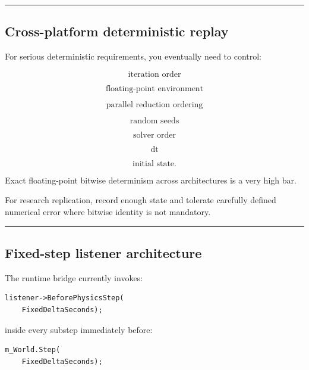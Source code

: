 \begin{center}\rule{0.5\linewidth}{0.5pt}\end{center}

\subsection{Cross-platform deterministic replay}\label{06-engine-ii-ch037-cross-platform-deterministic-replay}

\hypertarget{06-engine-ii-ch037-cross-platform-deterministic-replay}{}

For serious deterministic requirements, you eventually need to control:

\[
\text{iteration order}
\]

\[
\text{floating-point environment}
\]

\[
\text{parallel reduction ordering}
\]

\[
\text{random seeds}
\]

\[
\text{solver order}
\]

\[
\text{dt}
\]

\[
\text{initial state}.
\]

Exact floating-point bitwise determinism across architectures is a very high bar.

For research replication, record enough state and tolerate carefully defined numerical error where bitwise identity is not mandatory.

\begin{center}\rule{0.5\linewidth}{0.5pt}\end{center}

\subsection{Fixed-step listener architecture}\label{06-engine-ii-ch037-fixed-step-listener-architecture}

\hypertarget{06-engine-ii-ch037-fixed-step-listener-architecture}{}

The runtime bridge currently invokes:

\begin{verbatim}
listener->BeforePhysicsStep(
    FixedDeltaSeconds);
\end{verbatim}

inside every substep immediately before:

\begin{verbatim}
m_World.Step(
    FixedDeltaSeconds);
\end{verbatim}

